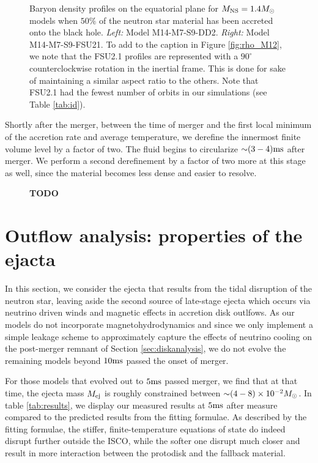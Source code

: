\begin{figure}
\begin{subfigure}[b]{0.475\textwidth}
		\label{fig:rho_M14_FSU21}
		\centering
	\end{subfigure}
	\caption[Density profiles on equatorial plane for $1.4 M_{\odot}$ models]{
	Baryon density profiles on the equatorial plane for $M_{\rm NS} = 1.4 M_{\odot}$ models when $50\%$ of the neutron star material has been accreted onto the black hole.
	\textit{Left:} Model M14-M7-S9-DD2.
	\textit{Right:} Model M14-M7-S9-FSU21.
	To add to the caption in Figure \ref{fig:rho_M12}, we note that the FSU2.1 profiles are represented with a $90^{\circ}$ counterclockwise rotation in the inertial frame.  This is done for sake of maintaining a similar aspect ratio to the others.  Note that FSU2.1 had the fewest number of orbits in our simulations (see Table \ref{tab:id}). 
	}
	\label{fig:rho_M14}
\end{figure}

Shortly after the merger, between the time of merger and the first local minimum of the accretion rate and average temperature, we derefine the innermost finite volume level by a factor of two.  The fluid begins to circularize $\mathord{\sim} (3-4) {\rm ms}$ after merger.  We perform a second derefinement by a factor of two more at this stage as well, since the material becomes less dense and easier to resolve.


\begin{figure}
	\centering
	
	\caption[]{
		\textbf{TODO}
	}
	\label{fig:restmass}
\end{figure}

\section{Outflow analysis: properties of the ejacta}
\label{tailanalysis}

In this section, we consider the ejecta that results from the tidal disruption of the neutron star, leaving aside the second source of late-stage ejecta which occurs via neutrino driven winds and magnetic effects in accretion disk outlfows.  As our models do not incorporate magnetohydrodynamics and since we only implement a simple leakage scheme to approximately capture the effects of neutrino cooling on the post-merger remnant of Section \ref{sec:diskanalysis}, we do not evolve the remaining models beyond $10 {\rm ms}$ passed the onset of merger.

For those models that evolved out to $5 {\rm ms}$ passed merger, we find that at that time, the ejecta mass $M_{\rm ej}$ is roughly constrained between $\mathord{\sim} (4 - 8) \times 10^{-2} M_\odot$.  In table \ref{tab:results}, we display our measured results at $5 {\rm ms}$ after measure compared to the predicted results from the fitting formulae.  As described by the fitting formulae, the stiffer, finite-temperature equations of state do indeed disrupt further outside the ISCO, while the softer one disrupt much closer and result in more interaction between the protodisk and the fallback material.

